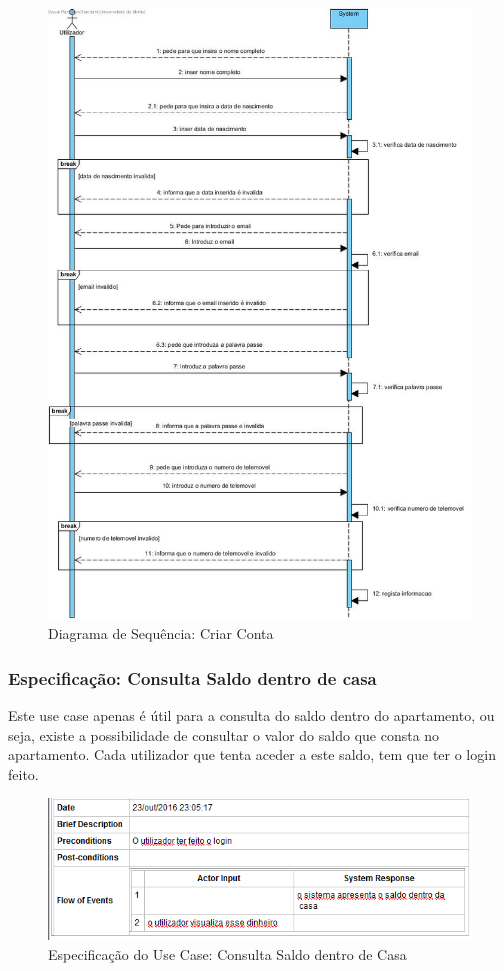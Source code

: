 \begin{figure}[htb!]
	\centering
	\includegraphics[scale=0.55]{imagens/diagramaSeq/CriarConta}  
	\caption{Diagrama de Sequência: Criar Conta}  
\end{figure}

\newpage \clearpage
\subsubsection{Especificação: Consulta Saldo dentro de casa }
Este use case apenas é útil para a consulta do saldo dentro do apartamento, ou seja, existe a possibilidade de consultar o valor do saldo que consta no apartamento. Cada utilizador que tenta aceder a este saldo, tem que ter o login feito.
\begin{figure}[htb!]
	\centering
	\includegraphics[scale=0.6]{imagens/Especificacoes/consultasaldodentrodecasa}  
	\caption{Especificação do Use Case: Consulta Saldo dentro de Casa   }  
\end{figure}

